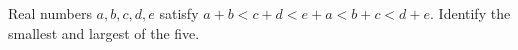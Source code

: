 Real numbers $ a,b,c,d,e $ satisfy $ a+b<c+d<e+a<b+c<d+e $. Identify the smallest and largest of the five.
